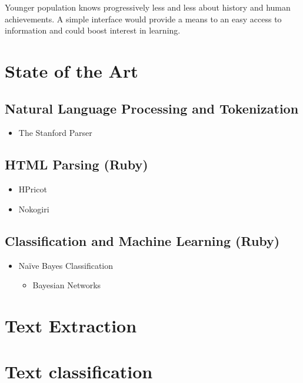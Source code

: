 \documentclass{llncs}
\begin{document}
Younger population knows progressively less and less about history and human achievements. A simple interface would provide a means to an easy access to information and could boost interest in learning.\\

\section{State of the Art}

\subsection{Natural Language Processing and Tokenization}

\begin{itemize}
	\item The Stanford Parser
\end{itemize}

\subsection{HTML Parsing (Ruby)}

\begin{itemize}
	\item HPricot
	\item Nokogiri
\end{itemize}

\subsection{Classification and Machine Learning (Ruby)}

\begin{itemize}
	\item Naïve Bayes Classification
	\begin{itemize}
		\item Bayesian Networks
	\end{itemize}
\end{itemize}

\section{Text Extraction}

\section{Text classification}
\end{document}
